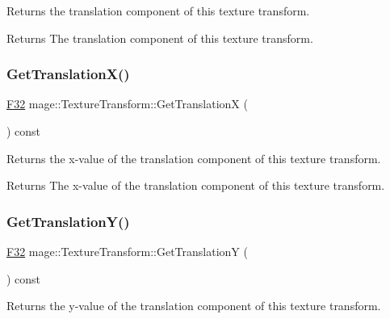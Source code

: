 Returns the translation component of this texture transform.

\begin{DoxyReturn}{Returns}
The translation component of this texture transform. 
\end{DoxyReturn}
\hypertarget{classmage_1_1_texture_transform_a94d51c47a75024fadfd849fc45e5268d}{}\label{classmage_1_1_texture_transform_a94d51c47a75024fadfd849fc45e5268d} 
\subsubsection{\texorpdfstring{Get\+Translation\+X()}{GetTranslationX()}}
{\footnotesize\ttfamily \hyperlink{namespacemage_aa97e833b45f06d60a0a9c4fc22ae02c0}{F32} mage\+::\+Texture\+Transform\+::\+Get\+TranslationX (\begin{DoxyParamCaption}{ }\end{DoxyParamCaption}) const\hspace{0.3cm}{\ttfamily [noexcept]}}

Returns the x-\/value of the translation component of this texture transform.

\begin{DoxyReturn}{Returns}
The x-\/value of the translation component of this texture transform. 
\end{DoxyReturn}
\hypertarget{classmage_1_1_texture_transform_a55bb63ee1f43af0208074fd876ba8d74}{}\label{classmage_1_1_texture_transform_a55bb63ee1f43af0208074fd876ba8d74} 
\subsubsection{\texorpdfstring{Get\+Translation\+Y()}{GetTranslationY()}}
{\footnotesize\ttfamily \hyperlink{namespacemage_aa97e833b45f06d60a0a9c4fc22ae02c0}{F32} mage\+::\+Texture\+Transform\+::\+Get\+TranslationY (\begin{DoxyParamCaption}{ }\end{DoxyParamCaption}) const\hspace{0.3cm}{\ttfamily [noexcept]}}

Returns the y-\/value of the translation component of this texture transform.

